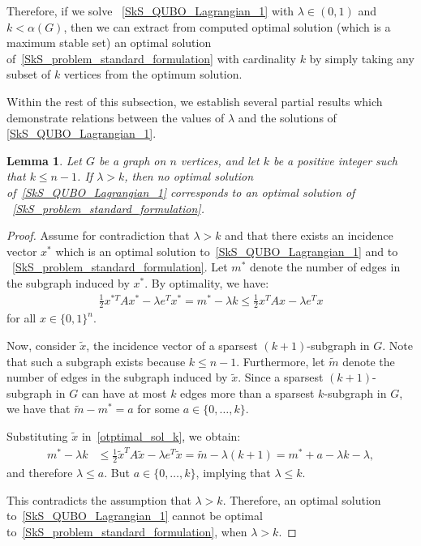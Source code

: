 \documentclass{article}
\newtheorem{lem}[thm]{Lemma}
\begin{document}
Therefore, if we solve ~\eqref{SkS_QUBO_Lagrangian_1} with $\lambda \in (0, 1)$ and $k < \alpha(G)$, then we can extract from computed optimal solution (which is a maximum stable set) an optimal solution of~\eqref{SkS_problem_standard_formulation} with cardinality $k$ by simply taking any subset of $k$ vertices from the optimum solution.

Within the rest of this subsection, we establish several partial results which demonstrate relations between the values of $\lambda$ and the solutions of \eqref{SkS_QUBO_Lagrangian_1}.

\begin{lem}\label{lambda_greater_k}
Let $G$ be a graph on $n$ vertices, and let $k$ be a positive integer such that $k \leq n - 1$. If $\lambda > k$, then no optimal solution of~\eqref{SkS_QUBO_Lagrangian_1} corresponds to an optimal solution of ~\eqref{SkS_problem_standard_formulation}.
\end{lem}

\begin{proof}
Assume for contradiction that $\lambda > k$ and that there exists an incidence vector $x^*$ which is an optimal solution to~\eqref{SkS_QUBO_Lagrangian_1} and to ~\eqref{SkS_problem_standard_formulation}. 
Let $m^*$ denote the number of edges in the subgraph induced by $x^*$. By optimality, we have: 
\begin{align}\label{otptimal_sol_k}
\frac{1}{2} x^{*T} A x^* - \lambda e^T x^* = m^* - \lambda k \leq \frac{1}{2} x^T A x - \lambda e^T x
\end{align}
for all $x \in \{0, 1\}^n$.

Now, consider $\tilde{x}$, the incidence vector of a sparsest $(k+1)$-subgraph in $G$. Note that such a subgraph exists because $k \leq n - 1$. Furthermore, let $\tilde{m}$ denote the number of edges in the subgraph induced by $\tilde{x}$. Since a sparsest $(k+1)$-subgraph in $G$ can have at most $k$ edges more than a sparsest $k$-subgraph in $G$, we have that $\tilde{m} - m^* = a$ for some $a \in \{0, \ldots, k\}$.

Substituting $\tilde{x}$ in~\eqref{otptimal_sol_k}, we obtain:
\begin{align*}
m^* - \lambda k & \leq \frac{1}{2} \tilde{x}^T A \tilde{x} - \lambda e^T \tilde{x} = \tilde{m} - \lambda (k+1) = m^* + a - \lambda k - \lambda,
\end{align*}
and therefore $\lambda \leq a$. But $a \in \{0, \dots, k\}$, implying that $\lambda \leq k$.

This contradicts the assumption that $\lambda > k$. Therefore, an optimal solution to~\eqref{SkS_QUBO_Lagrangian_1} cannot be optimal to~\eqref{SkS_problem_standard_formulation}, when $\lambda > k$. 
\end{proof}
\end{document}
